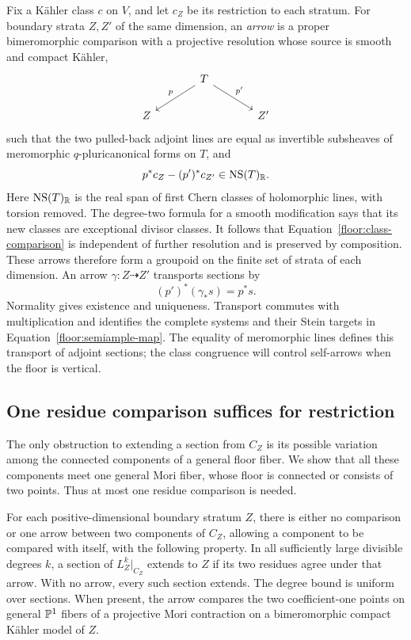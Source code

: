 Fix a K\"ahler class \(c\) on \(V\), and let \(c_Z\) be its restriction
to each stratum.  For boundary strata \(Z,Z'\) of the same dimension, an
\emph{arrow} is a proper bimeromorphic comparison with a projective
resolution whose source is smooth and compact K\"ahler,
\[
 \begin{tikzcd}[column sep=large]
 & T\arrow[dl,"p"']\arrow[dr,"p'"]&\\
 Z&&Z'
 \end{tikzcd}
\]
such that the two pulled-back adjoint lines are equal as invertible
subsheaves of meromorphic \(q\)-pluricanonical forms on \(T\), and
\begin{equation}\label{floor:class-comparison}
 p^*c_Z-(p')^*c_{Z'}\in\operatorname{NS}(T)_{\mathbb R}.
\end{equation}
Here \(\operatorname{NS}(T)_{\mathbb R}\) is the real span of first Chern classes of
holomorphic lines, with torsion removed.  The degree-two formula for a
smooth modification says that its new classes are exceptional divisor
classes.  It follows that Equation~\eqref{floor:class-comparison} is independent
of further resolution and is preserved by composition.  These arrows
therefore form a groupoid on the finite set of strata of each dimension.
An arrow \(\gamma:Z\dashrightarrow Z'\) transports sections by
\[
 (p')^*(\gamma_*s)=p^*s.
\]
Normality gives existence and uniqueness.  Transport commutes with
multiplication and identifies the complete systems and their Stein targets
in Equation~\eqref{floor:semiample-map}.
The equality of meromorphic lines defines this transport of adjoint sections; the class
congruence will control self-arrows when the floor is vertical.

\subsection{One residue comparison suffices for restriction}

The only obstruction to extending a section from \(C_Z\) is its possible
variation among the connected components of a general floor fiber.  We show
that all these components meet one general Mori fiber, whose floor is
connected or consists of two points.  Thus at most one residue comparison
is needed.

\begin{lemma}\label{floor:restriction}
For each positive-dimensional boundary stratum \(Z\), there is either no
comparison or one arrow between two components of \(C_Z\), allowing a
component to be compared with itself, with the following property.  In all
sufficiently large divisible degrees \(k\), a section of \(L_Z^k|_{C_Z}\)
extends to \(Z\) if its two residues agree under that arrow.  With no
arrow, every such section extends.  The degree bound is uniform over
sections.  When present, the arrow compares the two coefficient-one points
on general \(\mathbb P^1\) fibers of a projective Mori contraction on a
bimeromorphic compact K\"ahler model of \(Z\).
\end{lemma}

